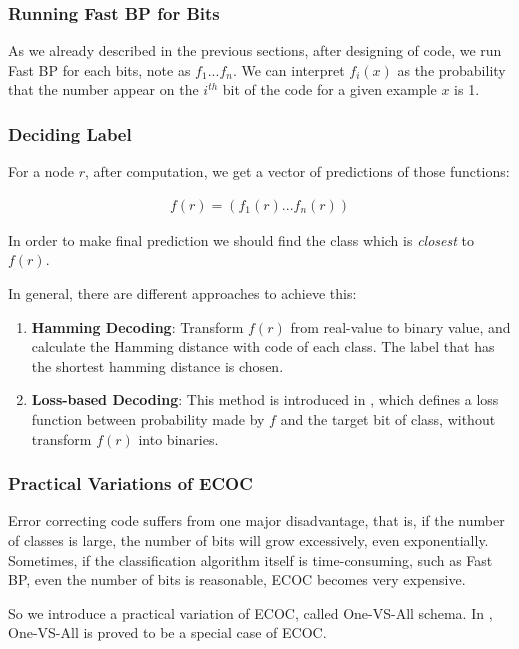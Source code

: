 \subsubsection*{Running Fast BP for Bits}

As we already described in the previous sections, after designing of code, we run Fast BP for each bits, note as $f_{1}...f_{n}$. We can interpret $f_{i}(x)$ as the probability that the number appear on the $i^{th}$ bit of the code for a given example $x$ is 1.

\subsubsection*{Deciding Label}

For a node $r$, after computation, we get a vector of predictions of those functions:

\begin{gather*}
    f(r) = (f_{1}(r)...f_{n}(r))
\end{gather*}


In order to make final prediction we should find the class which is \textit{closest} to $f(r)$.

In general, there are different approaches to achieve this:

\begin{enumerate}
    \item \textbf{Hamming Decoding}: Transform $f(r)$ from real-value to binary value, and calculate the Hamming distance with code of each class. The label that has the shortest hamming distance is chosen.
    \item \textbf{Loss-based Decoding}: This method is introduced in \cite{Erin2000}, which defines a loss function between probability made by $f$ and the target bit of class, without transform $f(r)$ into binaries.
\end{enumerate}

\subsubsection*{Practical Variations of ECOC}

Error correcting code suffers from one major disadvantage, that is, if the number of classes is large, the number of bits will grow excessively, even exponentially. Sometimes, if the classification algorithm itself is time-consuming, such as Fast BP, even the number of bits is reasonable, ECOC becomes very expensive.

So we introduce a practical variation of ECOC, called One-VS-All schema. In \cite{Erin2000}, One-VS-All is proved to be a special case of ECOC.

